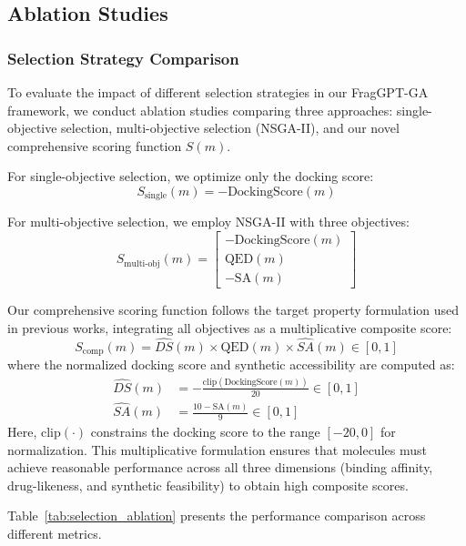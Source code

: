 \documentclass[lettersize,journal]{IEEEtran}
\begin{document}
\subsection{Ablation Studies}

\subsubsection{Selection Strategy Comparison}
To evaluate the impact of different selection strategies in our FragGPT-GA framework, we conduct ablation studies comparing three approaches: single-objective selection, multi-objective selection (NSGA-II), and our novel comprehensive scoring function $S(m)$. 

For single-objective selection, we optimize only the docking score:
\begin{equation}
S_{\text{single}}(m) = -\text{DockingScore}(m)
\end{equation}

For multi-objective selection, we employ NSGA-II with three objectives:
\begin{equation}
    S_{\text{multi-obj}}(m) = \begin{bmatrix} -\text{DockingScore}(m) \\ \text{QED}(m) \\ -\text{SA}(m) \end{bmatrix}
\end{equation}

Our comprehensive scoring function follows the target property formulation used in previous works, integrating all objectives as a multiplicative composite score:
\begin{equation}
S_{\text{comp}}(m) =  \widehat{DS}(m) \times \text{QED}(m) \times \widehat{SA}(m) \in [0,1]
\end{equation}
where the normalized docking score and synthetic accessibility are computed as:
\begin{align}
\widehat{DS}(m) &= -\frac{\text{clip}(\text{DockingScore}(m))}{20} \in [0,1] \\
\widehat{SA}(m) &= \frac{10 - \text{SA}(m)}{9} \in [0,1]
\end{align}
Here, $\text{clip}(\cdot)$ constrains the docking score to the range $[-20, 0]$ for normalization. This multiplicative formulation ensures that molecules must achieve reasonable performance across all three dimensions (binding affinity, drug-likeness, and synthetic feasibility) to obtain high composite scores.

Table~\ref{tab:selection_ablation} presents the performance comparison across different metrics.
\end{document}

